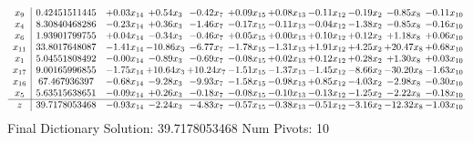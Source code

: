 \documentclass[9pt]{article}
\begin{document}
 \[\begin{array}{c| c c@{\hskip 2pt} c@{\hskip 2pt} c@{\hskip 2pt} c@{\hskip 2pt} c@{\hskip 2pt} c@{\hskip 2pt} c@{\hskip 2pt} c@{\hskip 2pt} c@{\hskip 2pt} }
 x_{9}   &  0.42451511445 & +  0.03 x_{14} & +  0.54 x_{3} & -0.42 x_{7} & +  0.09 x_{15} & +  0.08 x_{13} & -0.11 x_{12} & -0.19 x_{2} & -0.85 x_{8} & -0.11 x_{10}\\
 x_{4}   &  8.30840468286 & -0.23 x_{14} & +  0.36 x_{3} & -1.46 x_{7} & -0.17 x_{15} & -0.11 x_{13} & -0.04 x_{12} & -1.38 x_{2} & -0.85 x_{8} & -0.16 x_{10}\\
 x_{6}   &  1.93901799755 & +  0.04 x_{14} & -0.34 x_{3} & -0.46 x_{7} & +  0.05 x_{15} & +  0.00 x_{13} & +  0.10 x_{12} & +  0.12 x_{2} & +  1.18 x_{8} & +  0.06 x_{10}\\
 x_{11}   &  33.8017648087 & -1.41 x_{14} & -10.86 x_{3} & -6.77 x_{7} & -1.78 x_{15} & -1.31 x_{13} & +  1.91 x_{12} & +  4.25 x_{2} & + 20.47 x_{8} & +  0.68 x_{10}\\
 x_{1}   &  5.04551808492 & -0.00 x_{14} & -0.89 x_{3} & -0.69 x_{7} & -0.08 x_{15} & +  0.02 x_{13} & +  0.12 x_{12} & +  0.28 x_{2} & +  1.30 x_{8} & +  0.03 x_{10}\\
 x_{17}   &  9.00165996855 & -1.75 x_{14} & + 10.64 x_{3} & + 10.24 x_{7} & -1.51 x_{15} & -1.37 x_{13} & -1.45 x_{12} & -8.66 x_{2} & -30.20 x_{8} & -1.63 x_{10}\\
 x_{16}   &  67.467936397 & -0.68 x_{14} & -9.28 x_{3} & -9.93 x_{7} & -1.58 x_{15} & -0.98 x_{13} & +  0.85 x_{12} & -4.03 x_{2} & -2.98 x_{8} & -0.30 x_{10}\\
 x_{5}   &  5.63515638651 & -0.09 x_{14} & +  0.26 x_{3} & -0.18 x_{7} & -0.08 x_{15} & -0.10 x_{13} & -0.13 x_{12} & -1.25 x_{2} & -2.22 x_{8} & -0.18 x_{10}\\
\hline
z    &  39.7178053468 & -0.93 x_{14} & -2.24 x_{3} & -4.83 x_{7} & -0.57 x_{15} & -0.38 x_{13} & -0.51 x_{12} & -3.16 x_{2} & -12.32 x_{8} & -1.03 x_{10}\\
\end{array}\]
Final Dictionary
Solution:  39.7178053468
Num Pivots:  10
\end{document}
